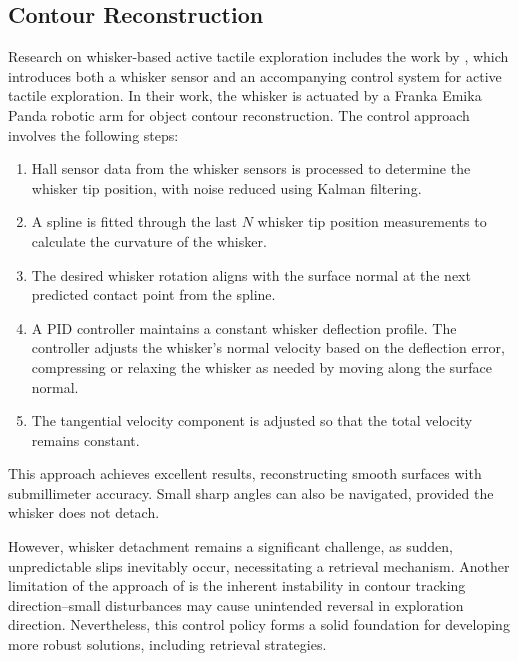 \subsection{Contour Reconstruction}
Research on whisker-based active tactile exploration includes the work by \textcite{dang2025whisker}, which introduces both a whisker sensor and an accompanying control system for active tactile exploration.
In their work, the whisker is actuated by a Franka Emika Panda robotic arm for object contour reconstruction.
The control approach involves the following steps:
\begin{enumerate}
    \item Hall sensor data from the whisker sensors is processed to determine the whisker tip position, with noise reduced using Kalman filtering.
    \item A spline is fitted through the last $N$ whisker tip position measurements to calculate the curvature of the whisker.
    \item The desired whisker rotation aligns with the surface normal at the next predicted contact point from the spline.
    \item A PID controller maintains a constant whisker deflection profile.
    The controller adjusts the whisker's normal velocity based on the deflection error, compressing or relaxing the whisker as needed by moving along the surface normal.
    \item The tangential velocity component is adjusted so that the total velocity remains constant.
\end{enumerate}

This approach achieves excellent results, reconstructing smooth surfaces with submillimeter accuracy.
Small sharp angles can also be navigated, provided the whisker does not detach.

However, whisker detachment remains a significant challenge, as sudden, unpredictable slips inevitably occur, necessitating a retrieval mechanism.
Another limitation of the approach of \citeauthor{dang2025whisker} is the inherent instability in contour tracking direction--small disturbances may cause unintended reversal in exploration direction.
Nevertheless, this control policy forms a solid foundation for developing more robust solutions, including retrieval strategies.

